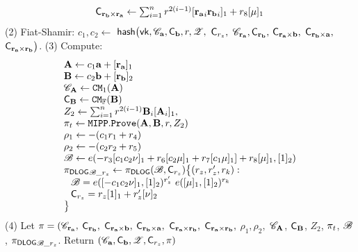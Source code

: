 \begin{small}
\begin{algorithm}[bt]
\[\begin{array} {l}
{\mathsf{C}}_{{\mathbf {r_b\times r_a}}} \leftarrow 
\sum_{i=1}^n r^{2(i-1)}[{{\mathbf {r_a}}}_i {{\mathbf {r_b}}}_i]_1
 + r_8 [\mu]_1
\end{array}
\]
 (2) Fiat-Shamir: $c_1, c_2 \leftarrow$
 	$\mathsf{hash}\big(\mathsf{vk},{\mathscr{C}}_{{\mathbf {a}}}, {\mathsf{C}}_{{\mathbf {b}}}, r, {\mathscr{Z}},$
		${\mathsf{C}}_{r_z}, $
		${\mathscr{C}}_{{\mathbf {r_a}}}, {\mathsf{C}}_{{\mathbf {r_b}}},$
		${\mathsf{C}}_{{\mathbf {r_a\times b}}},$
		${\mathsf{C}}_{{\mathbf {r_b\times a}}},$
		${\mathsf{C}}_{{\mathbf {r_a\times r_b}}}\big)$. \newline
 (3) Compute: \newline
	\[
		\begin{array}{l}
 {{\mathbf {A}}} \leftarrow c_1 {{\mathbf {a}}} + [{{\mathbf {r_a}}}]_1  \\
 {{\mathbf {B}}} \leftarrow c_2 {{\mathbf {b}}} + [{{\mathbf {r_b}}}]_2  \\
 {\mathscr{C}}_{{{\mathbf {A}}}} \leftarrow {\mathtt{CM}}_1({{\mathbf {A}}})  \\
 {\mathsf{C}}_{{{\mathbf {B}}}} \leftarrow {\mathtt{CM}}_{\mathbb{F}}({{\mathbf {B}}})  \\
 Z_2 \leftarrow \sum_{i=1}^n r^{2(i-1)} {{\mathbf {B}}}_i [{{\mathbf {A}}}_i]_1, \\
 \pi_t \leftarrow {\mathtt{MIPP}}.\texttt{Prove}({{\mathbf {A}}}, {{\mathbf {B}}}, r, Z_2) \\
 	   \rho_1 \leftarrow -(c_1 r_1 + r_4)  \\
	   \rho_2 \leftarrow -(c_2 r_2 + r_5) \\
 	{\mathscr{B}} \leftarrow 
 	e(-r_3 [c_1 c_2 \nu]_1 + r_6 [c_2 \mu]_1
 	+ r_7 [c_1 \mu]_1]  + r_8 [\mu]_1, [1]_2)  \\
	{\pi_{\textsf{DLOG}}}_{{\mathscr{B}}\_r_z} \leftarrow {\pi_{\textsf{DLOG}}}({\mathscr{B}},{\mathsf{C}}_{r_z}) 
	  \big\{(r_z, r_z', r_k): \\
	  \hspace*{0.1in}{\mathscr{B}} =  
	  	 e([-c_1c_2\nu]_1, [1]_2)^{r_z'} ~e([\mu]_1,  [1]_2) ^{r_k} \\
	  \hspace*{0.1in}{\mathsf{C}}_{r_z} = r_z[1]_1 + r_z'[\nu]_2 \\
	  \big\}
   \end{array} 
	\]
 (4) Let $\pi = ({\mathscr{C}}_{{\mathbf {r_a}}}, $
 			${\mathsf{C}}_{{\mathbf {r_b}}}, $
 			${\mathsf{C}}_{{\mathbf {r_a \times b}}}, $
 			${\mathsf{C}}_{{\mathbf {r_b \times a}}}, $
 			${\mathsf{C}}_{{\mathbf {r_a \times r_b}}}, $
 			${\mathsf{C}}_{{\mathbf {r_a \times r_b}}}, $
 			$\rho_1, \rho_2, $
			${\mathscr{C}}_{{\mathbf {A}}}$, ${\mathsf{C}}_{{\mathbf {B}}}$,
			$Z_2$,
			$\pi_t$, ${\mathscr{B}}$,
			${\pi_{\textsf{DLOG}}}_{{\mathscr{B}}\_r_z}$.
		Return $({\mathscr{C}}_{{{\mathbf {a}}}}, {\mathsf{C}}_{{{\mathbf {b}}}}, {\mathscr{Z}}, {\mathsf{C}}_{r_z},
				\pi)$


\end{algorithm}
\end{small}
